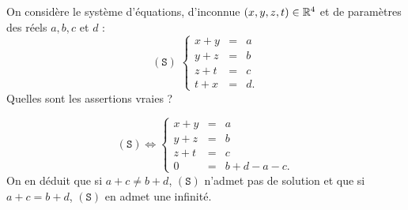 \begin{question}
On considère le système d'équations, d'inconnue $(x,y,z,t)\in \mathbb{R}^4$ et de paramètres des réels 
$a,b,c$ et $d$ :
$$(\mathtt{S}) \; \left\{\begin{array}{rcc}
x+y&=&a\\
y+z&=&b\\ 
z+t&=&c\\
t+x&=&d.\end{array}\right.$$
Quelles sont les assertions vraies ?
\begin{answers}  
\end{answers}
\begin{explanations} 
$$(\mathtt{S}) \Leftrightarrow  
\left\{\begin{array}{rcc}
x+y&=&a\\
y+z&=&b\\ 
z+t&=&c\\ 
0&=&b+d-a-c.\end{array}\right.$$
On en déduit que si $a+c\neq b+d$, $(\mathtt{S})$ n'admet pas de solution et que si $a+c= b+d$, 
$(\mathtt{S})$ en admet une infinité.
\end{explanations}
\end{question}


